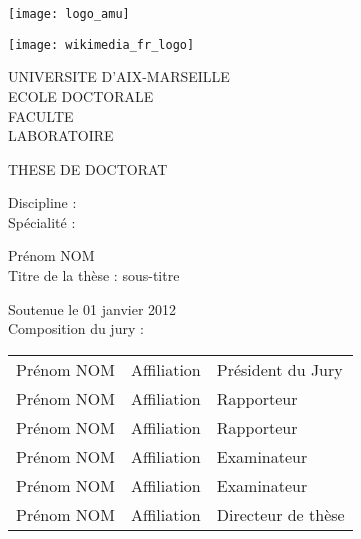 \titlepage
{}\selectfont{} %
\vspace*{-2cm}
\begin{center}
	\begin{minipage}[c]{0.25\linewidth}
		\raggedright \texttt{[image: logo\_amu]}
	\end{minipage}\hfill
	\begin{minipage}[c]{0.25\linewidth}
		\raggedleft \texttt{[image: wikimedia\_fr\_logo]}
	\end{minipage}\hfill 
\end{center}
\begin{flushleft}
        \vspace{0.2cm}
    \LARGE UNIVERSITE D’AIX-MARSEILLE\\
        \vspace{0.2cm}
    \Large ECOLE DOCTORALE\\
        \vspace{0.2cm}
    \normalsize FACULTE\\
        \vspace{0.2cm}
    LABORATOIRE\\
    \begin{center}
        \vspace{2cm}
    THESE DE DOCTORAT\\
    \end{center}
        \vspace{0.5cm}
    Discipline :\\
    Spécialité :\\
    \begin{center}
        \vspace{0.5cm}
    \Large Prénom NOM\\
        \vspace{1cm}
    \large Titre de la thèse : sous-titre\\
    \end{center}
        \vspace{3cm}
    \normalsize Soutenue le 01 janvier 2012\\
        \vspace{0.4cm}
    Composition du jury :\\
\end{flushleft}
\vspace{0.4cm}
\begin{tabular}{lll}
Prénom NOM & Affiliation & Président du Jury \\
    \vspace{0.08cm}
Prénom NOM & Affiliation & Rapporteur \\
    \vspace{0.08cm}
Prénom NOM & Affiliation & Rapporteur \\
    \vspace{0.08cm}
Prénom NOM & Affiliation & Examinateur \\
    \vspace{0.08cm}
Prénom NOM & Affiliation & Examinateur \\
    \vspace{0.08cm}
Prénom NOM & Affiliation & Directeur de thèse \\
\end{tabular}
\selectfont{} %